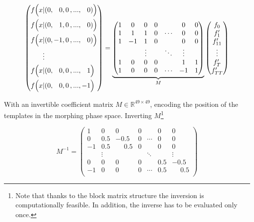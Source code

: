 \begin{equation*}
	\left(\begin{aligned}
		f\Bigl(x &| (0,\phantom{-}0, 0\,,...,\phantom{-}0)\Bigl) \\
		f\Bigl(x &| (0,\phantom{-}1, 0\,,...,\phantom{-}0)\Bigl) \\
		f\Bigl(x &| (0,-1, 0\,,...,\phantom{-}0)\Bigl) \\
		&\vdots \\
		f\Bigl(x &| (0,\phantom{-}0, 0\,,...,\phantom{-}1\Bigl) \\
		f\Bigl(x &| (0,\phantom{-}0, 0\,,...,-1\Bigl) \\
	\end{aligned}\right) = \underbrace{\left(\begin{matrix}
		1 & 0 & 0 & 0 & & 0 & 0 \\
		1 & 1 & 1 & 0 &  \cdots & 0 & 0 \\
		1 & -1 & 1 & 0 &      & 0 & 0 \\
		& & \vdots & & \ddots & \vdots & \\
		1 & 0 & 0 & 0 &       & 1 & 1 \\
		1 & 0 & 0 & 0 & \cdots & -1 & 1 \\
	\end{matrix}\right)}_{M} \left(\begin{matrix}
	f_0 \\
	f'_1 \\
	f'_{11} \\
	\vdots \\
	f'_T \\
	f'_{TT}
\end{matrix}\right)
\end{equation*}

With an invertible coefficient matrix $M \in \mathbb{R}^{49\times49}$, encoding the position of the templates in the morphing phase space. Inverting $M$\footnote{Note that thanks to the block matrix structure the inversion is computationally feasible. In addition, the inverse has to be evaluated only once.}

\begin{equation*}
	M^{-1} = \left(\begin{matrix}
		 1 & 0   & 0   & 0 &        & 0 & 0 \\
		 0 & 0.5 &-0.5 & 0 & \cdots & 0 & 0 \\
		-1 & 0.5 &\phantom{-}0.5 & 0 &        & 0 & 0 \\
		   & \vdots &     &    & \ddots &  & \vdots \\
		 0 & 0   & 0   & 0 &        & 0.5 & -0.5 \\
		-1 & 0   & 0   & 0 & \cdots & 0.5 & \phantom{-}0.5 \\
	\end{matrix}\right)
\end{equation*}

